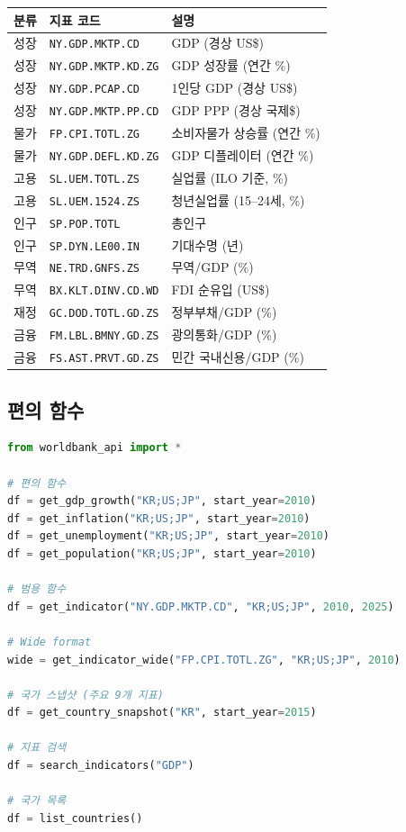 \documentclass[11pt,a4paper]{article}
\newcommand{\code}[1]{\texttt{#1}}
\begin{document}
\begin{longtable}{l l l}
\toprule
\textbf{분류} & \textbf{지표 코드} & \textbf{설명} \\
\midrule
\endhead
성장 & \code{NY.GDP.MKTP.CD}       & GDP (경상 US\$) \\
성장 & \code{NY.GDP.MKTP.KD.ZG}    & GDP 성장률 (연간 \%) \\
성장 & \code{NY.GDP.PCAP.CD}       & 1인당 GDP (경상 US\$) \\
성장 & \code{NY.GDP.MKTP.PP.CD}    & GDP PPP (경상 국제\$) \\
물가 & \code{FP.CPI.TOTL.ZG}       & 소비자물가 상승률 (연간 \%) \\
물가 & \code{NY.GDP.DEFL.KD.ZG}    & GDP 디플레이터 (연간 \%) \\
고용 & \code{SL.UEM.TOTL.ZS}       & 실업률 (ILO 기준, \%) \\
고용 & \code{SL.UEM.1524.ZS}       & 청년실업률 (15--24세, \%) \\
인구 & \code{SP.POP.TOTL}          & 총인구 \\
인구 & \code{SP.DYN.LE00.IN}       & 기대수명 (년) \\
무역 & \code{NE.TRD.GNFS.ZS}       & 무역/GDP (\%) \\
무역 & \code{BX.KLT.DINV.CD.WD}    & FDI 순유입 (US\$) \\
재정 & \code{GC.DOD.TOTL.GD.ZS}    & 정부부채/GDP (\%) \\
금융 & \code{FM.LBL.BMNY.GD.ZS}    & 광의통화/GDP (\%) \\
금융 & \code{FS.AST.PRVT.GD.ZS}    & 민간 국내신용/GDP (\%) \\
\bottomrule
\end{longtable}

\subsection{편의 함수}

\begin{lstlisting}[language=Python]
from worldbank_api import *

# 편의 함수
df = get_gdp_growth("KR;US;JP", start_year=2010)
df = get_inflation("KR;US;JP", start_year=2010)
df = get_unemployment("KR;US;JP", start_year=2010)
df = get_population("KR;US;JP", start_year=2010)

# 범용 함수
df = get_indicator("NY.GDP.MKTP.CD", "KR;US;JP", 2010, 2025)

# Wide format
wide = get_indicator_wide("FP.CPI.TOTL.ZG", "KR;US;JP", 2010)

# 국가 스냅샷 (주요 9개 지표)
df = get_country_snapshot("KR", start_year=2015)

# 지표 검색
df = search_indicators("GDP")

# 국가 목록
df = list_countries()
\end{lstlisting}
\end{document}
